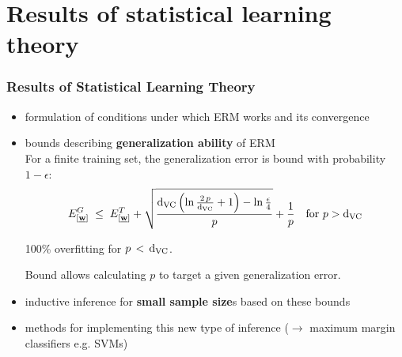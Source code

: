 \section{Results of statistical learning theory}

\begin{frame}\frametitle{Results of Statistical Learning Theory}
		\begin{itemize}
			\item formulation of conditions under which ERM works and its convergence 
			\item bounds describing \textbf{generalization ability} of ERM \\
            
            For a finite training set, the generalization error is bound with probability $1-\epsilon$:
            \begin{equation}
				E^{G}_{[\underline{\mathbf{w}}]} \;\le\; E^{T}_{[\underline{\mathbf{w}}]} + \sqrt{\frac{\mathrm{d}_{\mathrm{VC}} \left(\ln \frac{2\,p}{\mathrm{d}_{\mathrm{VC}}} + 1\right)-\ln\frac{\epsilon}{4}}{p}} +\frac{1}{p} \quad \text{for } p > \mathrm{d}_{\mathrm{VC}}
				\label{eq:generalizationresults}
            \end{equation}
            
            
            
            100\% overfitting for $p\,<\,\mathrm{d}_{\mathrm{VC}}$.
            
            Bound allows calculating $p$ to target a given generalization error.
            
			\item inductive inference for \textbf{small sample size}s 
				based on these bounds
			\item methods for implementing this new type 
				of inference ($\rightarrow$ maximum margin classifiers e.g. {SVMs})
		\end{itemize}
\end{frame}
